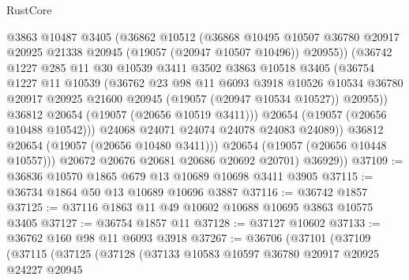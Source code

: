 \begin{lexlean}{RustCore}
\begin{coremodule}
                    @3863
                    @10487
                    @3405
                    (@36862
                      @10512
                      (@36868
                        @10495
                        @10507
                        @36780
                        @20917
                        @20925
                        @21338
                        @20945
                        (@19057 (@20947 @10507 @10496))
                        @20955))
                    (@36742
                      @1227
                      @285
                      @11
                      @30
                      @10539
                      @3411
                      @3502
                      @3863
                      @10518
                      @3405
                      (@36754
                        @1227
                        @11
                        @10539
                        (@36762
                          @23
                          @98
                          @11
                          @6093
                          @3918
                          @10526
                          @10534
                          @36780
                          @20917
                          @20925
                          @21600
                          @20945
                          (@19057 (@20947 @10534 @10527))
                          @20955))
                      @36812
                      @20654
                      (@19057 (@20656 @10519 @3411)))
                    @20654
                    (@19057 (@20656 @10488 @10542)))
                  @24068
                  @24071
                  @24074
                  @24078
                  @24083
                  @24089))
              @36812
              @20654
              (@19057 (@20656 @10480 @3411)))
            @20654
            (@19057 (@20656 @10448 @10557)))
          @20672
          @20676
          @20681
          @20686
          @20692
          @20701)
        @36929))
@37109 := @36836 @10570 @1865 @679 @13 @10689 @10698 @3411 @3905
@37115 := @36734 @1864 @50 @13 @10689 @10696 @3887
@37116 := @36742 @1857
@37125 := @37116 @1863 @11 @49 @10602 @10688 @10695 @3863 @10575 @3405
@37127 := @36754 @1857 @11
@37128 := @37127 @10602
@37133 := @36762 @160 @98 @11 @6093 @3918
@37267 := @36706
    (@37101
      (@37109
        (@37115
          (@37125
            (@37128
              (@37133
                @10583
                @10597
                @36780
                @20917
                @20925
                @24227
                @20945

\end{coremodule}
\end{lexlean}
